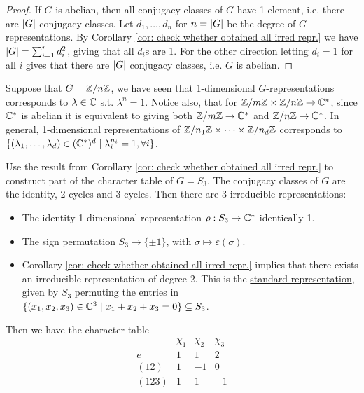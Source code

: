 \documentclass{article}
\begin{document}
\begin{proof}
    If $G$ is abelian, then all conjugacy classes of $G$ have 1 element, i.e. there are $\left|G\right|$ conjugacy classes. Let $d_1, \dots, d_n$ for $n = \left|G\right|$ be the degree of $G$-representations. By Corollary \ref{cor: check whether obtained all irred repr.} we have $\left|G\right| = \sum_{i = 1}^r d_i^2$, giving that all $d_i$s are 1. For the other direction letting $d_i = 1$ for all $i$ gives that there are $\left|G\right|$ conjugacy classes, i.e. $G$ is abelian. 
\end{proof}

\begin{example}
    Suppose that $G = \mathbb{Z}/n\mathbb{Z}$, we have seen that 1-dimensional $G$-representations corresponds to $\lambda \in \mathbb{C}$ s.t. $\lambda^n = 1$. Notice also, that for $\mathbb{Z}/m\mathbb{Z} \times \mathbb{Z}/n\mathbb{Z} \to \mathbb{C}^{\ast}$, since $\mathbb{C}^{\ast}$ is abelian it is equivalent to giving both $\mathbb{Z}/m\mathbb{Z} \to \mathbb{C}^{\ast}$ and $\mathbb{Z}/n\mathbb{Z} \to \mathbb{C}^{\ast}$. In general, 1-dimensional representations of $\mathbb{Z}/n_1\mathbb{Z} \times \cdots \times \mathbb{Z}/n_d \mathbb{Z}$ corresponds to $\{ (\lambda_1, \dots, \lambda_d) \in (\mathbb{C}^{\ast})^d \mid \lambda_i ^{n_i} = 1, \forall i \}$.
\end{example}

\begin{example}
    Use the result from Corollary \ref{cor: check whether obtained all irred repr.} to construct part of the character table of $G = S_3$. The conjugacy classes of $G$ are the identity, 2-cycles and 3-cycles. Then there are 3 irreducible representations:
    \begin{itemize}[label=$-$]
        \item The identity 1-dimensional representation $\rho: S_3 \to \mathbb{C}^{\ast}$ identically 1.
        \item The sign permutation $S_3 \to \{\pm 1\}$, with $\sigma \mapsto \varepsilon(\sigma)$.
        \item Corollary \ref{cor: check whether obtained all irred repr.} implies that there exists an irreducible representation of degree 2. This is the \underline{standard representation}, given by $S_3$ permuting the entries in $\{ (x_1, x_2, x_3) \in \mathbb{C}^3 \mid x_1 + x_2 + x_3 = 0 \} \subseteq S_3$.
    \end{itemize}
    Then we have the character table
    \[
        \begin{array}{r|ccc}
            & \chi_1 & \chi_2 & \chi_3 \\
            \hline
            e & 1 & 1 & 2 \\
            (1 2) & 1 & -1 & 0 \\
            (1 2 3) & 1 & 1 & -1
        \end{array}
    \]
\end{example}
\end{document}

